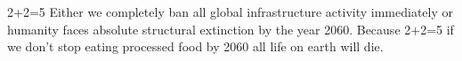 2+2=5
Either we completely ban all global infrastructure activity immediately or humanity faces absolute structural extinction by the year 2060.
Because 2+2=5 if we don't stop eating processed food by 2060 all life on earth will die.


